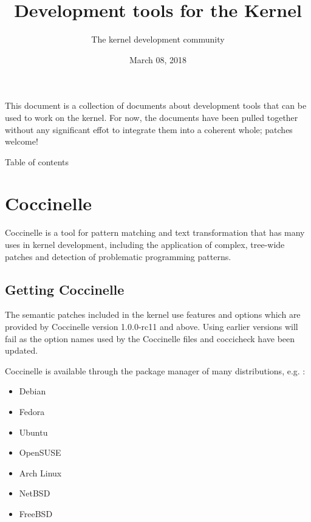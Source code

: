\documentclass[a4paper,8pt,english]{sphinxmanual}
\title{Development tools for the Kernel}
\date{March 08, 2018}
\author{The kernel development community}
\begin{document}
\maketitle
\tableofcontents
{}\label{dev-tools/index::doc}


This document is a collection of documents about development tools that can
be used to work on the kernel.  For now, the documents have been pulled
together without any significant effot to integrate them into a coherent
whole; patches welcome!

Table of contents


\chapter{Coccinelle}
\label{dev-tools/coccinelle:development-tools-for-the-kernel}\label{dev-tools/coccinelle::doc}\label{dev-tools/coccinelle:coccinelle}
Coccinelle is a tool for pattern matching and text transformation that has
many uses in kernel development, including the application of complex,
tree-wide patches and detection of problematic programming patterns.


\section{Getting Coccinelle}
\label{dev-tools/coccinelle:getting-coccinelle}
The semantic patches included in the kernel use features and options
which are provided by Coccinelle version 1.0.0-rc11 and above.
Using earlier versions will fail as the option names used by
the Coccinelle files and coccicheck have been updated.

Coccinelle is available through the package manager
of many distributions, e.g. :
\begin{itemize}
\item {} 
Debian

\item {} 
Fedora

\item {} 
Ubuntu

\item {} 
OpenSUSE

\item {} 
Arch Linux

\item {} 
NetBSD

\item {} 
FreeBSD

\end{itemize}
\end{document}
